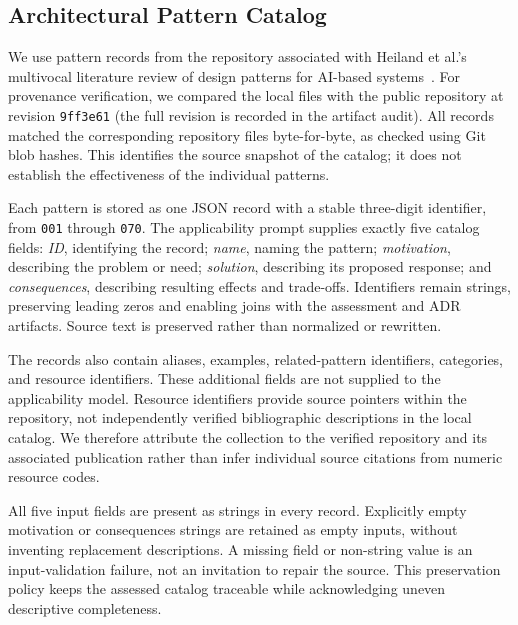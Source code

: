 
\subsection{Architectural Pattern Catalog}
\label{sec:pattern-catalog}

We use \StudyPatternCount{} pattern records from the repository associated
with Heiland et al.'s multivocal literature review of design patterns for
AI-based systems~\cite{heiland2023patterns,aiPatternsRepository}.
For provenance verification, we compared the local files with the public
repository at revision
\texttt{9ff3e61} (the full revision is recorded in the artifact audit).
All \StudyPatternCount{} records matched the corresponding repository files
byte-for-byte, as checked using Git blob hashes. This identifies the source
snapshot of the catalog; it does not establish the effectiveness of the
individual patterns.

Each pattern is stored as one JSON record with a stable three-digit identifier,
from \texttt{001} through \texttt{070}. The applicability prompt supplies exactly
five catalog fields: \emph{ID}, identifying the record; \emph{name}, naming
the pattern; \emph{motivation}, describing the problem or need;
\emph{solution}, describing its proposed response; and \emph{consequences},
describing resulting effects and trade-offs. Identifiers remain strings,
preserving leading zeros and enabling joins with the assessment and ADR
artifacts. Source text is preserved rather than normalized or rewritten.

The records also contain aliases, examples, related-pattern identifiers,
categories, and resource identifiers. These additional fields are not supplied
to the applicability model. Resource identifiers provide source pointers within
the repository, not independently verified bibliographic descriptions in the
local catalog. We therefore attribute the collection to the verified repository
and its associated publication rather than infer individual source citations
from numeric resource codes.

All five input fields are present as strings in every record. Explicitly empty
motivation or consequences strings are retained as empty inputs, without
inventing replacement descriptions. A missing field or non-string value is an
input-validation failure, not an invitation to repair the source. This
preservation policy keeps the assessed catalog traceable while acknowledging
uneven descriptive completeness.

